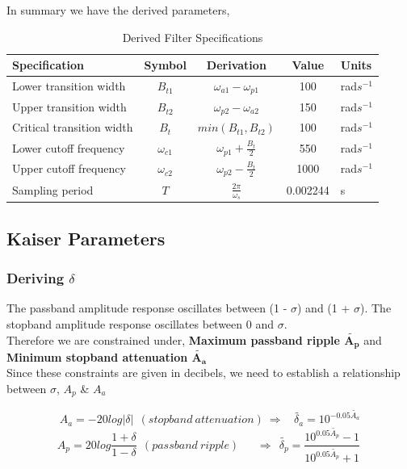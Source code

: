 \documentclass[11pt]{article}
\begin{document}
In summary we have the derived parameters, 
\begin{center}
    \begin{table}[h]
    \centering
    \caption {Derived Filter Specifications}
    \begin{tabular}{@{}lcccl@{}}
        \toprule
            {Specification} & {Symbol} & {Derivation} & {Value} & {Units}  \\
            \midrule
            Lower transition width & $B_{t1}$           & $\omega_{a1}-\omega_{p1}$   & 100     & rad$s^{-1}$  \\
            Upper transition width & $B_{t2}$           & $\omega_{p2}-\omega_{a2}$   & 150     & rad$s^{-1}$  \\
            Critical transition width & $B_t$           & $ min( B_{t1} ,B_{t2})$        & 100     & rad$s^{-1}$  \\
            Lower cutoff frequency & $\omega_{c1}$      & $\omega_{p1}+\frac{B_t}{2}$ & 550     & rad$s^{-1}$  \\
            Upper cutoff frequency & $\omega_{c2}$      & $\omega_{p2}-\frac{B_t}{2}$ & 1000    & rad$s^{-1}$  \\
            Sampling period & $T$                       & $\frac{2\pi}{\omega_s}$     & 0.002244  & s  \\
        \bottomrule
    \end{tabular}
    \end{table}
    \end{center}

\subsection{Kaiser Parameters}
\subsubsection{Deriving $\delta$}
The passband amplitude response oscillates between (1 - $\sigma$) and (1 + $\sigma$). The stopband amplitude response oscillates between 0 and $\sigma$.
\\Therefore we are constrained under, {\bf Maximum passband ripple $\mathbf{\tilde{A_p}}$} and {\bf Minimum stopband attenuation $\mathbf{\tilde{A_a}}$ }
\\Since these constraints are given in decibels, we need to establish a relationship between $\sigma$,
 ${A_p}$ \& ${A_a}$

$$A_{a} =-20log|\delta | \ \  (stopband \ attenuation)\  \Rightarrow \ \ \ \ \tilde{\delta _{a}} =10^{-0.05\tilde{A_{a}}} $$
$$A_{p} =20log\frac{1+\delta }{1-\delta } \ \ (passband \ ripple)\ \ \ \ \ \ \ \Rightarrow \ \  \tilde{\delta _{p}} =\frac{10^{0.05\tilde{A_{p}}} -1}{10^{0.05\tilde{A_{p}}} +1} \ 
$$
\end{document}
